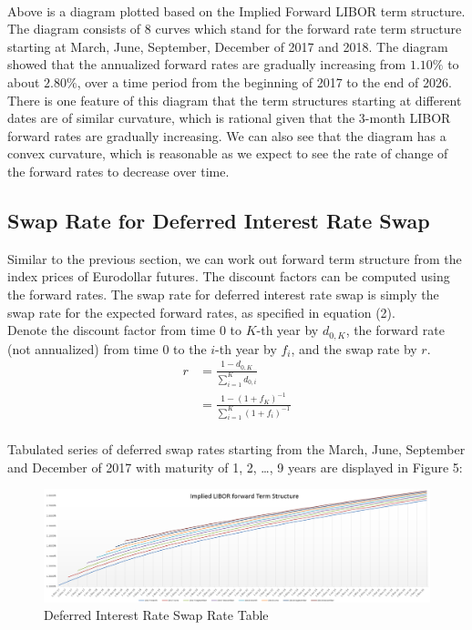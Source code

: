 \\[2mm]Above is a diagram plotted based on the Implied Forward LIBOR term structure. The diagram consists of 8 curves which stand for the forward rate term structure starting at March, June, September, December of 2017 and 2018. The diagram showed that the annualized forward rates are gradually increasing from $1.10\%$ to about $2.80\%$, over a time period from the beginning of 2017 to the end of 2026. There is one feature of this diagram that the term structures starting at different dates are of similar curvature, which is rational given that the 3-month LIBOR forward rates are gradually increasing. We can also see that the diagram has a convex curvature, which is reasonable as we expect to see the rate of change of the forward rates to decrease over time.
\newpage

\subsection{Swap Rate for Deferred Interest Rate Swap}
Similar to the previous section, we can work out forward term structure from the index prices of Eurodollar futures. The discount factors can be computed using the forward rates. The swap rate for deferred interest rate swap is simply the swap rate for the expected forward rates, as specified in equation (2).
\\Denote the discount factor from time 0 to $K$-th year by $d_{0,K}$, the forward rate (not annualized) from time 0 to the $i$-th year by $f_{i}$, and the swap rate by $r$.
\begin{equation}
\begin{split}
r &= \frac{1 - d_{0,K}}{\sum_{i=1}^{K} d_{0,i}}\\
&= \frac{1 - (1 + f_{K})^{-1}}{\sum_{i=1}^{K} (1 + f_{i})^{-1}}
\end{split}
\end{equation}
\\Tabulated series of deferred swap rates starting from the March, June, September and December of 2017 with maturity of 1, 2, \dots, 9 years are displayed in Figure 5:
\begin{figure}[h]
	\centering
	\includegraphics[scale=0.4]{biu.PNG}
	\caption{Deferred Interest Rate Swap Rate Table}
\end{figure}
